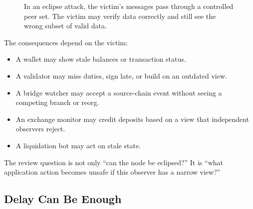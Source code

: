 \begin{figure}[htbp]
\centering
{}
\caption{In an eclipse attack, the victim's messages pass through a controlled peer set. The victim may verify data correctly and still see the wrong subset of valid data.}
\end{figure}

The consequences depend on the victim:

\begin{itemize}
\item A wallet may show stale balances or transaction status.
\item A validator may miss duties, sign late, or build on an outdated view.
\item A bridge watcher may accept a source-chain event without seeing a competing branch or reorg.
\item An exchange monitor may credit deposits based on a view that independent observers reject.
\item A liquidation bot may act on stale state.
\end{itemize}

The review question is not only ``can the node be eclipsed?'' It is ``what application action becomes unsafe if this observer has a narrow view?''

\subsection{Delay Can Be Enough}

